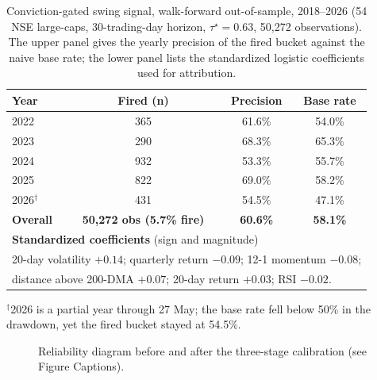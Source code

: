 \documentclass[12pt,a4paper]{article}
\begin{document}
\clearpage
\begin{table}[p]
\centering
\caption{Conviction-gated swing signal, walk-forward out-of-sample, 2018--2026
(54 NSE large-caps, 30-trading-day horizon, $\tau^{\star}=0.63$, 50{,}272
observations). The upper panel gives the yearly precision of the fired bucket
against the naive base rate; the lower panel lists the standardized logistic
coefficients used for attribution.}
\label{tab:swing}
\begin{singlespace}
\small
\begin{tabular}{lccc}
\toprule
\textbf{Year} & \textbf{Fired (n)} & \textbf{Precision} & \textbf{Base rate} \\
\midrule
2022 & 365 & 61.6\% & 54.0\% \\
2023 & 290 & 68.3\% & 65.3\% \\
2024 & 932 & 53.3\% & 55.7\% \\
2025 & 822 & 69.0\% & 58.2\% \\
2026$^{\dagger}$ & 431 & 54.5\% & 47.1\% \\
\midrule
\textbf{Overall} & \textbf{50{,}272 obs (5.7\% fire)} & \textbf{60.6\%} & \textbf{58.1\%} \\
\midrule
\multicolumn{4}{l}{\textbf{Standardized coefficients} (sign and magnitude)}\\
\multicolumn{4}{l}{20-day volatility $+0.14$; quarterly return $-0.09$; 12-1 momentum $-0.08$;}\\
\multicolumn{4}{l}{distance above 200-DMA $+0.07$; 20-day return $+0.03$; RSI $-0.02$.}\\
\bottomrule
\end{tabular}
\end{singlespace}
\vspace{2pt}
{\footnotesize $^{\dagger}$2026 is a partial year through 27 May; the base rate
fell below 50\% in the drawdown, yet the fired bucket stayed at 54.5\%.}
\end{table}

\clearpage
\begin{figure}[p]
\centering
{}
\caption{Reliability diagram before and after the three-stage calibration
(see Figure Captions).}
\label{fig:calib}
\end{figure}
\end{document}

